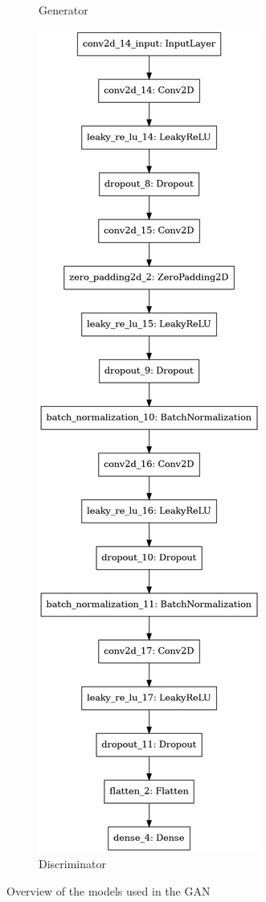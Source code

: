 \documentclass[13pt]{article}
\begin{document}
\begin{figure}
\begin{subfigure}[b]{0.36\textwidth}
        \caption{Generator}
        \label{fig:generator}
    \end{subfigure}
    \hspace{3cm}
    \begin{subfigure}[b]{0.36\textwidth}
        \includegraphics[width=\textwidth]{plots/discriminator.png}
        \caption{Discriminator}
        \label{fig:discriminator}
    \end{subfigure}
    \vspace{5mm}
    \caption{Overview of the models used in the GAN}
\end{figure}
\end{document}
